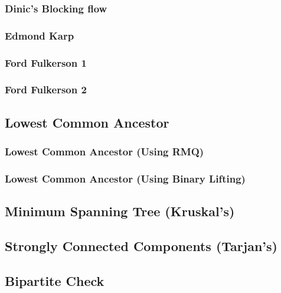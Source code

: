 \documentclass[twocolumn, landscape]{report}
\begin{document}
                \subsubsection{Dinic's Blocking flow}
                
                \subsubsection{Edmond Karp}
                
                \subsubsection{Ford Fulkerson 1}
                
                \subsubsection{Ford Fulkerson 2}
                
            \subsection{Lowest Common Ancestor}
                \subsubsection{Lowest Common Ancestor (Using RMQ)}
                
                \subsubsection{Lowest Common Ancestor (Using Binary Lifting)}
                
            \subsection{Minimum Spanning Tree (Kruskal's)}
            
            \subsection{Strongly Connected Components (Tarjan's)}
            
            \subsection{Bipartite Check}
            
\end{document}
